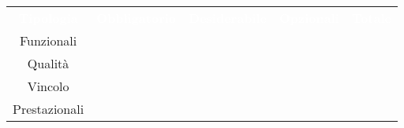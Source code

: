 \renewcommand{\arraystretch}{1.5}


\begin{longtable}{|c c c c c|} 
	
	\rowcolor{darkblue}
	\textcolor{white}{\textbf{Tipologia}}&
	\textcolor{white}{\textbf{Obbligatorio}}&
	\textcolor{white}{\textbf{Desiderabile}}&
	\textcolor{white}{\textbf{Opzionali}}&
	\textcolor{white}{\textbf{Totale}}\\
	
	Funzionali & \actualrfunO & \actualrfunD & \actualrfunZ & \actualrfun \\
	Qualità & \actualrquaO & \actualrquaD & \actualrquaZ & \actualrqua \\
	Vincolo & \actualrvinO & \actualrvinD & \actualrvinZ & \actualrvin \\
	Prestazionali & \actualrpreO & \actualrpreD & \actualrpreZ & \actualrpre \\

\end{longtable}
